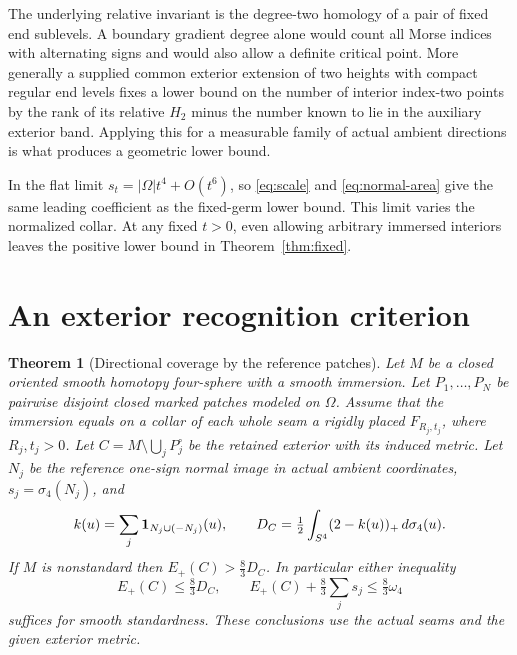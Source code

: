 \documentclass[11pt,letterpaper]{article}
\numberwithin{equation}{section}
\newtheorem{theorem}{Theorem}[section]
\theoremstyle{definition}
\begin{document}
The underlying relative invariant is the degree-two homology of
a pair of fixed end sublevels. A boundary gradient degree alone
would count all Morse indices with alternating signs and would
also allow a definite critical point. More generally a supplied
common exterior extension of two heights with compact regular
end levels fixes a lower bound on the number of interior index-two
points by the rank of its relative \(H_2\) minus the number
known to lie in the auxiliary exterior band. Applying this for a
measurable family of actual ambient directions is what produces
a geometric lower bound.

In the flat limit \(s_t=|\Omega|t^4+O(t^6)\), so
\eqref{eq:scale} and \eqref{eq:normal-area} give the same
leading coefficient as the fixed-germ lower bound. This limit
varies the normalized collar. At any fixed \(t>0\), even
allowing arbitrary immersed interiors leaves the positive
lower bound in Theorem~\ref{thm:fixed}.

\section{An exterior recognition criterion}\label{sec:exterior}

\begin{theorem}[Directional coverage by the reference patches]
\label{thm:exterior}
Let \(M\) be a closed oriented smooth homotopy four-sphere with a
smooth immersion. Let \(P_1,\ldots,P_N\) be pairwise disjoint
closed marked patches modeled on \(\Omega\). Assume that the immersion
equals on a collar of each whole seam a rigidly placed
\(F_{R_j,t_j}\), where \(R_j,t_j>0\).
Let \(C=M\setminus\bigcup_j P_j^\circ\) be the retained exterior
with its induced metric. Let \(N_j\) be the reference one-sign normal
image in actual ambient coordinates, \(s_j=\sigma_4(N_j)\), and
\[
 k(u)=\sum_j{\bf1}_{N_j\cup(-N_j)}(u),\qquad
 D_C=\tfrac12\int_{S^4}(2-k(u))_+\,d\sigma_4(u).
\]
If \(M\) is nonstandard then \(E_+(C)>\tfrac83D_C\).
In particular either inequality
\[
 E_+(C)\le\tfrac83D_C,\qquad
 E_+(C)+\tfrac83\sum_j s_j\le\tfrac83\omega_4
\]
suffices for smooth standardness. These conclusions use
the actual seams and the given exterior metric.
\end{theorem}
\end{document}
